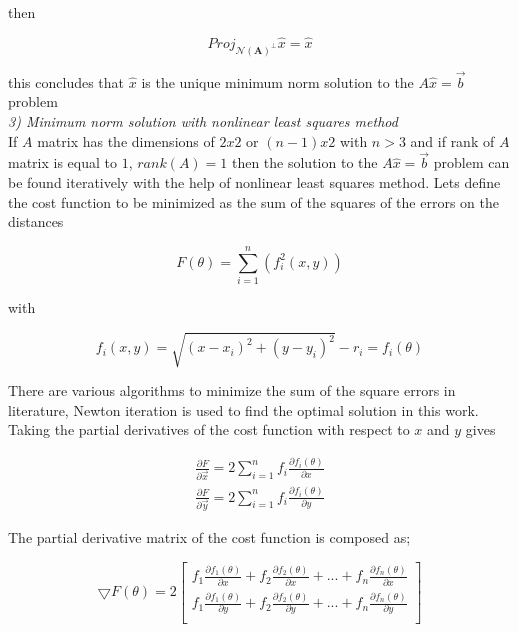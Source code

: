 \documentclass[twoside]{article}
\begin{document}
  then 
  
  \begin{equation}
Proj_{ \mathcal{N}(\mathbf{A})^\perp}\hat{x} = \hat{x}
  \end{equation}
  
  this concludes that $\hat{x}$ is the unique minimum norm solution to the $A\hat{x} = \vec{b}$ problem\\
	
	
	\textit{3) Minimum norm solution with nonlinear least squares method}\\	
	If $A$ matrix has the dimensions of $2x2$ or $(n-1)x2$ with $n>3$ and if rank of $A$ matrix is equal to $1$, $rank(A) = 1$ then the solution to the $A\hat{x} = \vec{b}$ problem can be found iteratively with the help of nonlinear least squares method. Lets define the cost function to be minimized 	as the sum of the squares of the errors on the distances
	
	\begin{equation}
    F(\theta) = \sum_{i=1}^{n} \left(f_i^2(x,y)\right)
	\end{equation}
	
	with
	
	\begin{equation}
   f_i(x,y) = \sqrt{(x-x_i)^2 + (y - y_i)^2} - r_i = f_i(\theta) 
	\end{equation}

There are various algorithms to minimize the sum of the square errors in literature, Newton iteration is used to find the optimal solution in this work.  Taking the partial derivatives of the cost function with respect to $x$ and $y$ gives 

\begin{align*}
\frac{\partial{F}}{\partial{\vec{x}}} = 2\sum_{i=1}^{n}f_i\frac{\partial{f_i(\theta)}}{\partial{x}} \\
\frac{\partial{F}}{\partial{\vec{y}}} = 2\sum_{i=1}^{n}f_i\frac{\partial{f_i(\theta)}}{\partial{y}}
\end{align*}

The partial derivative matrix of the cost function is composed as;

\begin{equation}
\bigtriangledown{F(\theta)} = 2 
\begin{bmatrix}
f_1\frac{\partial{f_1(\theta)}}{\partial{x}} + f_2\frac{\partial{f_2(\theta)}}{\partial{x}} + ... + f_n\frac{\partial{f_n(\theta)}}{\partial{x}} \\
f_1\frac{\partial{f_1(\theta)}}{\partial{y}} + f_2\frac{\partial{f_2(\theta)}}{\partial{y}} + ... + f_n\frac{\partial{f_n(\theta)}}{\partial{y}} \\
\end{bmatrix}
\end{equation}	
	
\end{document}
